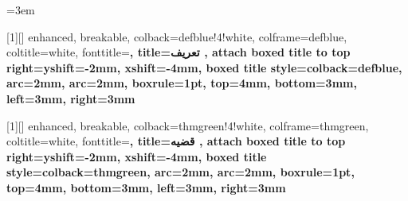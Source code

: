 
\usepackage{geometry}
\geometry{
    a4paper,
    top=2.0cm,
    bottom=2.0cm,
    inner=2.0cm,
    outer=1.8cm,
    headheight=14pt,
    footskip=0.8cm
}

\emergencystretch=3em

\usepackage{amsmath,amssymb,amsfonts,mathtools}
\usepackage{bm}

\usepackage{graphicx}
\usepackage{float}
\usepackage{caption}
\usepackage{subcaption}
\usepackage{tikz}
\usetikzlibrary{shapes,arrows.meta,positioning,calc,fit,backgrounds,trees,decorations.pathreplacing}

\usepackage{booktabs}
\usepackage{array}
\usepackage{multirow}
\usepackage{tabularx}

\usepackage[most]{tcolorbox}
\usepackage{xcolor}


[1][]{%
    enhanced,
    breakable,
    colback=defblue!4!white,
    colframe=defblue,
    coltitle=white,
    fonttitle=\bfseries,
    title={تعریف \thetcbcounter{}},
    attach boxed title to top right={yshift=-2mm, xshift=-4mm},
    boxed title style={colback=defblue, arc=2mm},
    arc=2mm,
    boxrule=1pt,
    top=4mm, bottom=3mm, left=3mm, right=3mm
}

[1][]{%
    enhanced,
    breakable,
    colback=thmgreen!4!white,
    colframe=thmgreen,
    coltitle=white,
    fonttitle=\bfseries,
    title={قضیه \thetcbcounter{}},
    attach boxed title to top right={yshift=-2mm, xshift=-4mm},
    boxed title style={colback=thmgreen, arc=2mm},
    arc=2mm,
    boxrule=1pt,
    top=4mm, bottom=3mm, left=3mm, right=3mm
}

